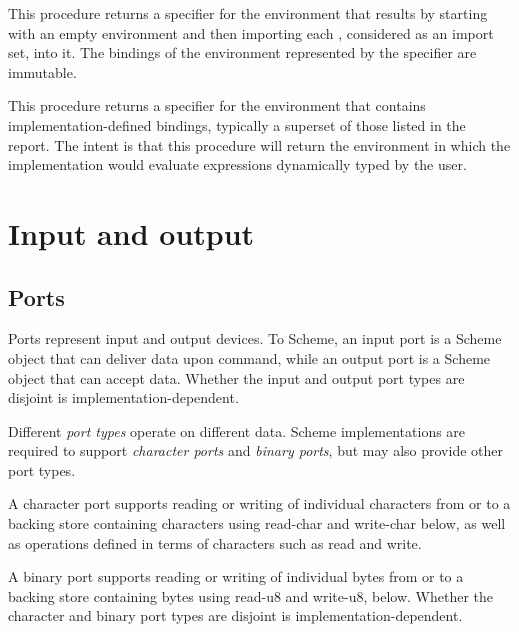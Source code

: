 \begin{entry}{%
}

This procedure returns a specifier for the environment that results by
starting with an empty environment and then importing each ,
considered as an import set, into it.  The bindings of the environment
represented by the specifier are immutable.

\end{entry}

\begin{entry}{%
}

This procedure returns a specifier for the environment that
contains imple\-men\-ta\-tion-defined bindings, typically a superset of
those listed in the report.  The intent is that this procedure
will return the environment in which the implementation would evaluate
expressions dynamically typed by the user.

\end{entry}

\section{Input and output}

\subsection{Ports}
\label{portsection}

Ports represent input and output devices.  To Scheme, an input port is
a Scheme object that can deliver data upon command, while an output
port is a Scheme object that can accept data.
Whether the input and output port types are disjoint is
implementation-dependent.

Different {\em port types} operate on different data.  Scheme
imple\-men\-ta\-tions are required to support {\em character ports}
and {\em binary ports}, but may also provide other port types.

A character port supports reading or writing of individual characters
from or to a backing store containing characters
using {\cf read-char} and {\cf write-char} below, as well as operations
defined in terms of characters such as {\cf read} and {\cf write}.

A binary port supports reading or writing of individual bytes from
or to a backing store containing bytes using {\cf read-u8} and {\cf
write-u8}, below.
Whether the character and binary port types are disjoint is
implementation-dependent.

